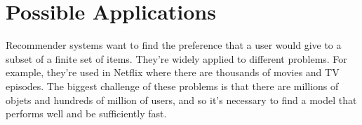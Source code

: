 \documentclass{article}
\theoremstyle{plain}
\theoremstyle{definition}
\begin{document}
\section{Possible Applications}

Recommender systems want to find the preference that a user would give to a subset of a finite set of items. They're widely applied to different problems. For example, they're used in Netflix where there are thousands of movies and TV episodes. The biggest challenge of these problems is that there are millions of objets and hundreds of million of users, and so it's necessary to find a model that performs well and be sufficiently fast.



\nocite{langley00}





%
%
%
\end{document}
